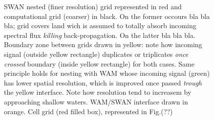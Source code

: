 \documentclass[12pt]{article}
\begin{document}
\begin{figure}[t!]
    \caption[Nested Grids in SWAN and WAM coupling]{SWAN nested (finer resolution) grid represented in red and computational grid (coarser) in black. On the former occours bla bla bla; grid covers land wich is assumed to totally absorb incoming spectral flux \textit{killing} back-propagation. On the latter bla bla bla. Boundary zone between grids drawn in yellow: note how incoming signal (outside yellow rectangle) duplicates or triplicates \textit{once crossed} boundary (inside yellow rectangle) for both cases. Same principle holds for nesting with WAM whose incoming signal (green) has lower spatial resolution, which is improved once passed \textit{trough} the yellow interface. Note how resolution tend to increasem by approaching shallow waters. WAM/SWAN interface drawn in orange. Cell grid (red filled box), represented in Fig.(??)}
    \label{fig:nesting}
\end{figure}
\end{document}
